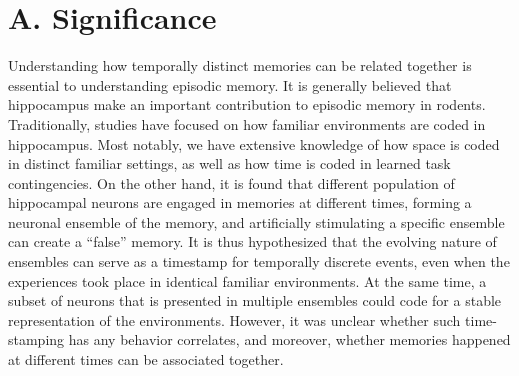 \documentclass[master.tex]{subfiles}
\begin{document}
\section*{A. Significance}

Understanding how temporally distinct memories can be related together is
essential to understanding episodic memory. It is generally believed that
hippocampus make an important contribution to episodic memory in rodents.
Traditionally, studies have focused on how familiar environments are coded in
hippocampus. Most notably, we have extensive knowledge of how space is coded in
distinct familiar settings, as well as how time is coded in learned task
contingencies. On the other hand, it is found that different population of
hippocampal neurons are engaged in memories at different times, forming a
neuronal ensemble of the memory, and artificially stimulating a specific
ensemble can create a ``false'' memory. It is thus hypothesized that the
evolving nature of ensembles can serve as a timestamp for temporally discrete
events, even when the experiences took place in identical familiar environments.
At the same time, a subset of neurons that is presented in multiple ensembles
could code for a stable representation of the environments. However, it was
unclear whether such time-stamping has any behavior correlates, and moreover,
whether memories happened at different times can be associated together.
\end{document}

